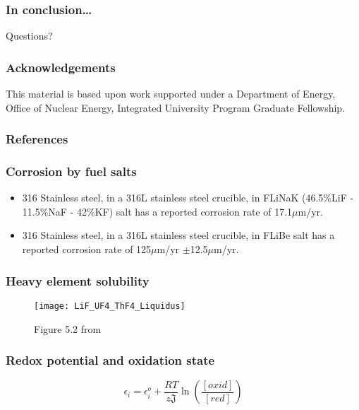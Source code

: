 \documentclass{beamer}
\begin{document}
\begin{frame}
\frametitle{In conclusion\ldots}

    Questions?

\end{frame}

\begin{frame}
\frametitle{Acknowledgements}

    This material is based upon work supported under a Department of Energy,
    Office of Nuclear Energy, Integrated University Program Graduate Fellowship.

\end{frame}

\begin{frame}[allowframebreaks]
\frametitle{References}



\end{frame}

\begin{frame}
\frametitle{Corrosion by fuel salts}

    \begin{itemize}
        \item 316 Stainless steel, in a 316L stainless steel crucible, in FLiNaK (46.5\%LiF - 11.5\%NaF - 42\%KF) salt has a reported corrosion rate of 17.1$\mu$m/yr. \cite{zheng_corrosion_2015}
        \item 316 Stainless steel, in a 316L stainless steel crucible, in FLiBe salt has a reported corrosion rate of 125$\mu$m/yr $\pm$12.5$\mu$m/yr. \cite{sellers_materials_2012}
    \end{itemize}

\end{frame}

\begin{frame}
\frametitle{Heavy element solubility}

    \begin{figure}
        \centering
        \texttt{[image: LiF\_UF4\_ThF4\_Liquidus]}
        \caption{Figure 5.2 from \cite{rosenthal_development_1972}}
        \label{fig:lifufthf_liquidus}
    \end{figure}

\end{frame}

\begin{frame}
\frametitle{Redox potential and oxidation state}

    \begin{equation}
    \label{Nernst}
        \epsilon_{i} = \epsilon_{i}^{o} + \frac{RT}{z\mathfrak{J}}\ln\left(\frac{[oxid]}{[red]}\right)
    \end{equation}

\end{frame}
\end{document}
